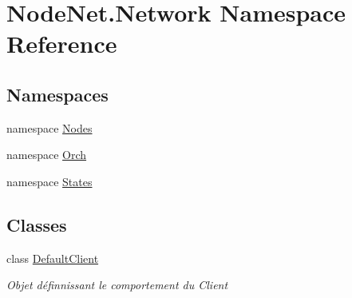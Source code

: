 \hypertarget{namespace_node_net_1_1_network}{}\section{Node\+Net.\+Network Namespace Reference}
\label{namespace_node_net_1_1_network}
\subsection*{Namespaces}
\begin{DoxyCompactItemize}
\item 
namespace \hyperlink{namespace_node_net_1_1_network_1_1_nodes}{Nodes}
\item 
namespace \hyperlink{namespace_node_net_1_1_network_1_1_orch}{Orch}
\item 
namespace \hyperlink{namespace_node_net_1_1_network_1_1_states}{States}
\end{DoxyCompactItemize}
\subsection*{Classes}
\begin{DoxyCompactItemize}
\item 
class \hyperlink{class_node_net_1_1_network_1_1_default_client}{Default\+Client}
\begin{DoxyCompactList}\small\item\em Objet définnissant le comportement du Client \end{DoxyCompactList}\end{DoxyCompactItemize}
